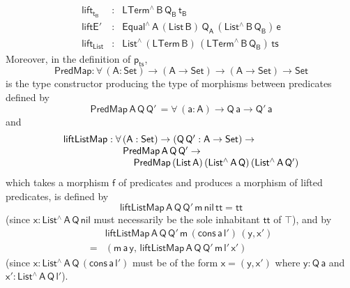 \documentclass[sigplan,screen]{acmart}
\begin{document}
\[\begin{array}{lll}
\mathsf{lift_{t_B}} & : & \mathsf{LTerm^{\wedge} \, B\, Q_B\, t_B} \\
\mathsf{liftE'} & : & \mathsf{Equal^{\wedge}\, A\, (List\,B)\, Q_A\, (List^{\wedge}\, B\, Q_B)\, e} \\
\mathsf{lift_{List}} & : & \mathsf{List^{\wedge} \, (LTerm\, B) \,
  (LTerm^{\wedge}\, B\, Q_B) \, ts}
\end{array}
\]
Moreover, in the definition of $\mathsf{p_{ts}}$, \[\mathsf{PredMap :
  \forall\, (A : Set) \to (A \to Set) \to (A \to
  Set) \to Set }\] is the type constructor producing the type of
morphisms between predicates defined by
\[\mathsf{PredMap \,A\, Q\,Q'\,
  = \forall\, (a : A) \to Q\,a \to Q'\,a}\] and
\[\begin{array}{l}
\mathsf{liftListMap : \forall\, (A : Set) \to (Q \, Q' : A \to Set)
  \to}\\\
\hspace*{0.8in}\mathsf{PredMap\,A\,Q\,Q' \to}\\
\hspace*{1in}\mathsf{PredMap\,(List\,A)
  \,(List^{\wedge}\, A\, Q)\, (List^{\wedge}\, A\, Q')}
\end{array}\]
which takes a morphism $\mathsf{f}$ of predicates and produces a
morphism of lifted predicates, is defined by
\[\mathsf{liftListMap\, A\, Q\, Q'\, m\, nil\, tt = tt}\]
(since $\mathsf{x : List^{\wedge}\,
  A\, Q\, nil}$ must necessarily be the sole inhabitant $\mathsf{tt}$
of $\mathsf{\top}$), and by
\[\begin{array}{ll}
 & \mathsf{liftListMap\, A\, Q\, Q'\, m\,
  (cons\, a\, l')\, (y, x')}\\
= & \mathsf{(m\,a\,y, \,liftListMap\, A\,
  Q\, Q'\, m\, l'\, x')}
\end{array}\] (since $\mathsf{x : List^{\wedge}\, A\,
  Q\, (cons\, a\, l')}$ must be of the form $\mathsf{x = (y, x')}$
where $\mathsf{y : Q\,a}$ and $\mathsf{x' : List^{\wedge}\, A\, Q\,
  l'}$).
\end{document}
